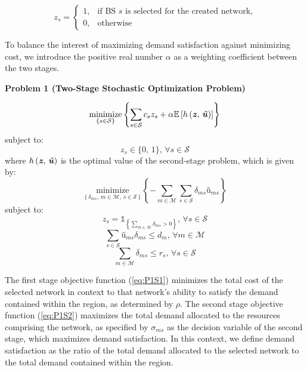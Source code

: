 \documentclass[onecolumn,draftcls]{IEEEtran}
\begin{document}
\[ z_s =
	\begin{cases}
		1,& \text{if BS $s$ is selected for the created network,}\\
		0,& \text{otherwise}
	\end{cases}
\]

To balance the interest of maximizing demand satisfaction against minimizing cost, we introduce the positive real number $\alpha$ as a weighting coefficient between the two stages.

\vspace{5mm}
\noindent \textbf{Problem 1 (Two-Stage Stochastic Optimization Problem)}


\begin{equation} \label{eq:P1S1}
\underset{\left\{s \in \mathcal{S}\right\}}{\text{minimize}} \left\{ \sum_{s \in \mathcal{S}} c_s z_s + \alpha \mathbb{E}\left[ h\left( \textbf{\textit{z}},\, \textbf{\textit{\~u}} \right) \right] \right\}
\end{equation}
subject to:
\begin{equation} \label{eq:P1S1C1}
z_s \in \{0,\, 1\},\, \forall s \in \mathcal{S}
\end{equation}
where $h\left( \textbf{\textit{z}},\, \textbf{\textit{\~u}} \right)$ is the optimal value of the second-stage problem, which is given by:
\begin{equation} \label{eq:P1S2}
\underset{\left\{\delta_{ms},\, m \in \mathcal{M},\, s \in \mathcal{S} \right\}}{\text{minimize}} \left\{ - \sum_{m \in \mathcal{M}} \sum_{s \in \mathcal{S}} \delta_{ms} \textit{\~u}_{ms} \right\}
\end{equation}
subject to:
\begin{equation} \label{eq:P1S2C1}
z_s = \mathbb{1}_{\left\{\sum_{m \in \mathcal{M}} \delta_{ms} > 0 \right\}},\, \forall s \in \mathcal{S}
\end{equation}
\begin{equation} \label{eq:P1S2C2}
\sum_{s \in \mathcal{S}} \textit{\~u}_{ms} \delta_{ms} \leq d_m,\, \forall m \in \mathcal{M}
\end{equation}
\begin{equation} \label{eq:P1S2C3}
\sum_{m \in \mathcal{M}} \delta_{ms} \leq r_s,\, \forall s \in \mathcal{S}
\end{equation}

The first stage objective function (\ref{eq:P1S1}) minimizes the total cost of the selected network in context to that network's ability to satisfy the demand contained within the region, as determined by $\rho$.  The second stage objective function (\ref{eq:P1S2}) maximizes the total demand allocated to the resources comprising the network, as specified by $\sigma_{ms}$ as the decision variable of the second stage, which maximizes demand satisfaction.  In this context, we define demand satisfaction as the ratio of the total demand allocated to the selected network to the total demand contained within the region.
\end{document}
